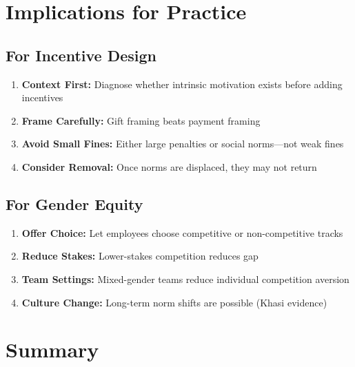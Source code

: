 \section{Implications for Practice}

\subsection{For Incentive Design}

\begin{enumerate}
    \item \textbf{Context First:} Diagnose whether intrinsic motivation exists before adding incentives
    \item \textbf{Frame Carefully:} Gift framing beats payment framing
    \item \textbf{Avoid Small Fines:} Either large penalties or social norms---not weak fines
    \item \textbf{Consider Removal:} Once norms are displaced, they may not return
\end{enumerate}

\subsection{For Gender Equity}

\begin{enumerate}
    \item \textbf{Offer Choice:} Let employees choose competitive or non-competitive tracks
    \item \textbf{Reduce Stakes:} Lower-stakes competition reduces gap
    \item \textbf{Team Settings:} Mixed-gender teams reduce individual competition aversion
    \item \textbf{Culture Change:} Long-term norm shifts are possible (Khasi evidence)
\end{enumerate}

\section{Summary}

